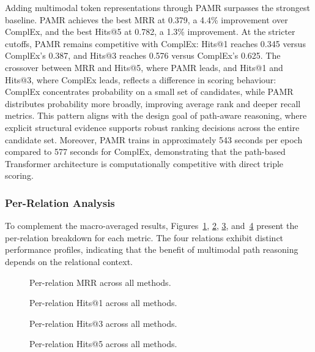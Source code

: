 \documentclass[runningheads]{llncs}
\begin{document}
Adding multimodal token representations through PAMR surpasses the
strongest baseline. PAMR achieves the best MRR at 0.379, a 4.4\%
improvement over ComplEx, and the best Hits@5 at 0.782, a 1.3\%
improvement. At the stricter cutoffs, PAMR remains competitive with
ComplEx: Hits@1 reaches 0.345 versus ComplEx's 0.387, and Hits@3
reaches 0.576 versus ComplEx's 0.625. The crossover between MRR and
Hits@5, where PAMR leads, and Hits@1 and Hits@3, where ComplEx leads,
reflects a difference in scoring behaviour: ComplEx concentrates
probability on a small set of candidates, while PAMR distributes
probability more broadly, improving average rank and deeper recall
metrics. This pattern aligns with the design goal of path-aware
reasoning, where explicit structural evidence supports robust ranking
decisions across the entire candidate set. Moreover, PAMR trains in
approximately 543 seconds per epoch compared to 577 seconds for
ComplEx, demonstrating that the path-based Transformer architecture is
computationally competitive with direct triple scoring.

\subsubsection{Per-Relation Analysis}

To complement the macro-averaged results, Figures~\ref{fig:mrr},
\ref{fig:hits1}, \ref{fig:hits3}, and~\ref{fig:hits5} present the
per-relation breakdown for each metric. The four relations exhibit
distinct performance profiles, indicating that the benefit of
multimodal path reasoning depends on the relational context.

\begin{figure}[t]
  \centering
  
  \caption{Per-relation MRR across all methods.}
  \label{fig:mrr}
\end{figure}

\begin{figure}[t]
  \centering
  
  \caption{Per-relation Hits@1 across all methods.}
  \label{fig:hits1}
\end{figure}

\begin{figure}[t]
  \centering
  
  \caption{Per-relation Hits@3 across all methods.}
  \label{fig:hits3}
\end{figure}

\begin{figure}[t]
  \centering
  
  \caption{Per-relation Hits@5 across all methods.}
  \label{fig:hits5}
\end{figure}
\end{document}
